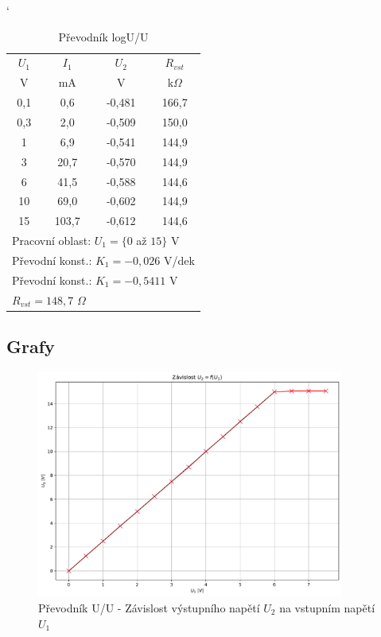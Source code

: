 \documentclass[a4paper, czech]{article}
\begin{document}
\begin{table}[H]
    \catcode`
    \centering
    \caption{Převodník logU/U}
    \begin{tabular}{cccc}
        \toprule
        $U_1$  & $I_1$  & $U_2$    & $R_{vst}$ \\
        \cmidrule(rl){1-1}
        \cmidrule(rl){2-2}
        \cmidrule(rl){3-3}
        \cmidrule(rl){4-4}
        V   & mA  & V     & k$\Omega$ \\
        \midrule
        0,1 & 0,6   & -0,481 & 166,7 \\
        0,3 & 2,0   & -0,509 & 150,0 \\
        1   & 6,9   & -0,541 & 144,9 \\
        3   & 20,7  & -0,570 & 144,9 \\
        6   & 41,5  & -0,588 & 144,6 \\
        10  & 69,0  & -0,602 & 144,9 \\
        15  & 103,7 & -0,612 & 144,6 \\
        \bottomrule
        \multicolumn{4}{l}{Pracovní oblast: $U_1 = \{0$ až $15\}$ V} \\
        \multicolumn{4}{l}{Převodní konst.: $K_1 = -0,026$ V/dek} \\
        \multicolumn{4}{l}{Převodní konst.: $K_1 = -0,5411$ V} \\
        \multicolumn{4}{l}{$R_{vst} = 148,7$ $\Omega$} \\
    \end{tabular}
\end{table}

\subsection{Grafy}

\begin{figure}[H]
    \centering
    \includegraphics[width=0.9\textwidth]{grafy/graf_prevodnik_UU.pdf}
    \caption{Převodník U/U - Závislost výstupního napětí $U_2$ na vstupním napětí $U_1$}
\end{figure}
\end{document}
